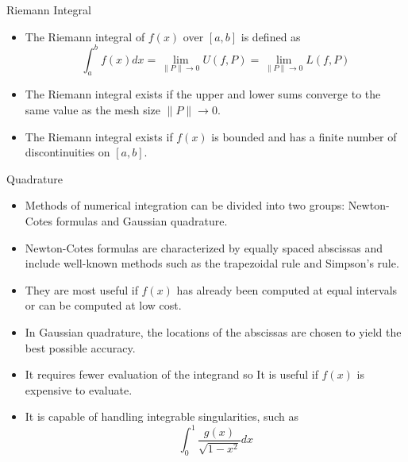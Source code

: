 \documentclass{beamer}
\begin{document}
\begin{frame}{Riemann Integral}
  \begin{itemize}
    \item The \alert{Riemann integral} of $f(x)$ over $[a,b]$ is defined as
      \[
      \int_a^b f(x) d x =\lim_{\|P\|\rightarrow 0} U(f,P)=\lim_{\|P\|\rightarrow 0} L(f,P)
      \]
    \item The Riemann integral exists if the upper and lower sums converge to the same value as the mesh size $\|P\|\rightarrow 0$.
    \item The Riemann integral exists if $f(x)$ is \alert{bounded} and has a \alert{finite number of discontinuities} on $[a,b]$.
  \end{itemize}
\end{frame}

\begin{frame}{Quadrature}
\begin{itemize}
\item Methods of numerical integration can be divided into two groups: Newton-Cotes formulas and Gaussian quadrature. 
\item Newton-Cotes formulas are characterized by \alert{equally spaced abscissas} and include well-known methods such as the trapezoidal rule and Simpson's rule. 
\item They are most useful if $f(x)$ has already been computed at equal intervals or can be computed at low cost.
\item In Gaussian quadrature, the locations of the abscissas are chosen to yield the \alert{best possible accuracy}.
\item  It requires fewer evaluation of the integrand so It is useful if $f(x)$ is expensive to evaluate. 
\item It is capable of handling \alert{integrable singularities}, such as
\[
\int_0^1 \frac{g(x)}{\sqrt{1-x^2}} dx
\]
\end{itemize}
\end{frame}
\end{document}
